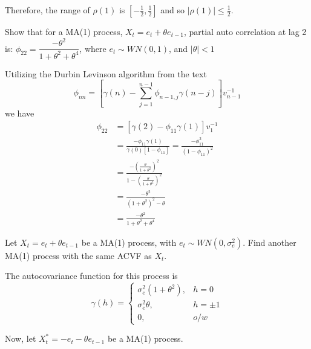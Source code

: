 \documentclass[10pt,a4paper]{exam}
\begin{document}
\begin{questions}
\begin{solution}
Therefore, the range of $\rho(1)$ is $\left[-\frac{1}{2},\frac{1}{2}\right]$ and so $|\rho(1)| \leq \frac{1}{2}$.
\end{solution}

\question Show that for a MA(1) process, $X_t = e_t + \theta e_{t-1}$, partial auto correlation at lag 2 is:
$\phi_{22} = \dfrac{-\theta^2}{1 + \theta^2 + \theta^4}$, where $e_t \sim WN(0,1)$, and $|\theta| < 1$

\begin{solution}
Utilizing the Durbin Levinson algorithm from the text
$$\phi_{nn} = \left[\gamma(n) - \sum_{j=1}^{n-1} \phi_{n-1,j}\gamma(n-j)\right]v_{n-1}^{-1}$$
we have
\begin{align*}
\phi_{22} 		&= \left[\gamma(2) - \phi_{11}\gamma(1)\right]v_1^{-1}\\
					&= \frac{-\phi_{11}\gamma(1)}{\gamma(0)\left[1 - \phi_{11}\right]} = \frac{-\phi_{11}^2}{\left(1 - \phi_{11}\right)^2}\\
					&= \frac{-\left(\frac{\theta}{1+\theta^2}\right)^2}{1 - \left(\frac{\theta}{1+\theta^2}\right)^2}\\
					&= \frac{-\theta^2}{(1+\theta^2)^2 - \theta}\\
					&= \frac{-\theta^2}{1 + \theta^2 + \theta^4}
\end{align*}
\end{solution}
\pagebreak

\question Let $X_t = e_t + \theta e_{t-1}$ be a MA(1) process, with $e_t \sim WN(0, \sigma_e^2)$. Find another MA(1) process with the same ACVF as $X_t$.

\begin{solution}
The autocovariance function for this process is
$$\gamma(h) = \begin{cases}
\sigma^2_e (1 + \theta^2),			& h = 0\\
\sigma^2_e \theta				,		& h = \pm 1\\
0,												& o/w
\end{cases}$$

Now, let $X_t^* = -e_t -\theta e_{t-1}$ be a MA(1) process.


\end{solution}
\end{questions}
\end{document}
